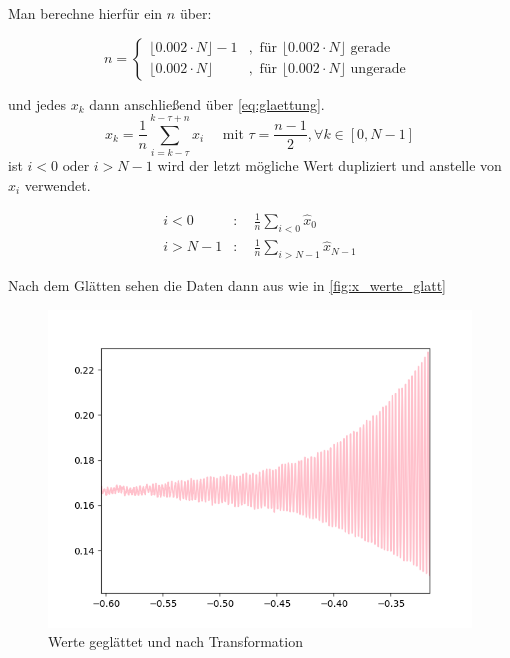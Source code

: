 Man berechne hierfür ein $n$ über:

\begin{equation}
    n= \begin{cases}
           \lfloor 0.002 \cdot N\rfloor-1 & , \text { für }\lfloor 0.002 \cdot N\rfloor \text { gerade } \\ \lfloor 0.002 \cdot N\rfloor & , \text { für }\lfloor 0.002 \cdot N\rfloor \text { ungerade }
    \end{cases}\label{eq:auswahl n}
\end{equation}

und jedes $x_k$ dann anschließend über \autoref{eq:glaettung}.
\begin{equation}
    x_{k}=\frac{1}{n} \sum_{i=k-\tau}^{k-\tau+n} \hat{x}_{i} \quad \text { mit } \tau=\frac{n-1}{2}, \forall k \in[0, N-1]\label{eq:glaettung}
\end{equation}
ist $i<0 \text{ oder } i>N-1$ wird der letzt mögliche Wert dupliziert und anstelle von $\hat{x}_{i}$ verwendet.

\begin{align}
    i<0 &: \quad \frac{1}{n}\sum_{i<0} \hat{x}_0\\
    i>N-1 &: \quad \frac{1}{n}\sum_{i>N-1} \hat{x}_{N-1}
\end{align}

Nach dem Glätten sehen die Daten dann aus wie in \autoref{fig:x_werte_glatt}

\begin{figure}[htb]
    \centering
    \includegraphics[scale=0.62]{images/Werte_glatt}
    \caption{Werte geglättet und nach Transformation}
    \label{fig:x_werte_glatt}
\end{figure}

